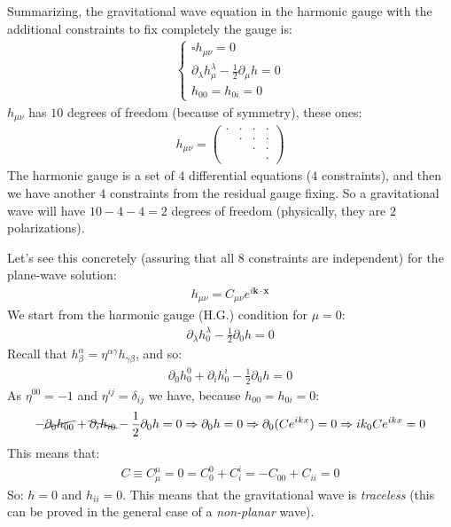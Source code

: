 \documentclass[../template.tex]{subfiles}
\begin{document}
Summarizing, the gravitational wave equation in the harmonic gauge with the additional constraints to fix completely the gauge is:
\begin{align*}
    \begin{cases}
        \square h_{\mu \nu} = 0\\
        \partial_\lambda  h^\lambda_\mu - \frac{1}{2} \partial_\mu h = 0\\
        h_{00} = h_{0i} = 0 
    \end{cases}
\end{align*}
$h_{\mu \nu}$ has $10$ degrees of freedom (because of symmetry), these ones:
\begin{align*}
    h_{\mu \nu} = \left(\begin{array}{cccc}
    \cdot & \cdot & \cdot & \cdot \\ 
     & \cdot & \cdot & \cdot \\ 
     &  & \cdot & \cdot \\ 
     &  &  & \cdot
    \end{array}\right)
\end{align*}
The harmonic gauge is a set of $4$ differential equations ($4$ constraints), and then we have another $4$ constraints from the residual gauge fixing. So a gravitational wave will have $10-4-4=2$ degrees of freedom (physically, they are $2$ polarizations).

\medskip

Let's see this concretely (assuring that all $8$ constraints are independent) for the plane-wave solution:
\begin{align*}
    h_{\mu \nu} = C_{\mu \nu} e^{i\bm{k}\cdot \bm{x}}
\end{align*}
We start from the harmonic gauge (H.G.) condition for $\mu=0$:
\begin{align*}
    \partial_\lambda h^\lambda_0 - \frac{1}{2} \partial_0 h = 0 
\end{align*}
Recall that $h^\alpha_\beta= \eta^{\alpha \gamma} h_{\gamma \beta}$, and so:
\begin{align*}
    \partial_0 h^0_{0} + \partial_i h^i_0 - \frac{1}{2} \partial_0 h = 0 
\end{align*} 
As $\eta^{00} = -1$ and $\eta^{ij} = \delta_{ij}$ we have, because $h_{00} = h_{0i} = 0$:
\begin{align*}
    -\cancel{\partial_0 h_{00}} +\bcancel{ \partial_i h_{i0}} - \frac{1}{2} \partial_0 h = 0 \Rightarrow \partial_0 h = 0 \Rightarrow \partial_0 (C e^{ikx}) = 0 \Rightarrow ik_0 C e^{ikx} = 0
\end{align*}
This means that:
\begin{align*}
    C \equiv C^\mu_\mu = 0 = C^0_0 + C^i_i =-C_{00} + C_{i i} = 0
\end{align*}
So: $h=0$ and $h_{i i} = 0$. This means that the gravitational wave is \textit{traceless} (this can be proved in the general case of a \textit{non-planar} wave).
\end{document}
